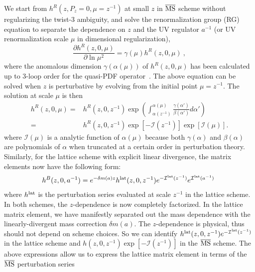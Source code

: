 \documentclass[prd,aps,nofootinbib,superscriptaddress,floatfix,preprintnumbers,twocolumn]{revtex4}
\newcommand{\FIXME}[1]{\textcolor{red}{ [FIXME: #1] }}
\begin{document}
We start from $h^R(z,P_z=0,\mu=z^{-1})$ at small $z$ in $\overline{\rm MS}$ scheme without regularizing the twist-3 ambiguity, and solve the renormalization group (RG) equation to separate the dependence on $z$ and the UV regulator $a^{-1}$ (or UV renormalization scale $\mu$ in dimensional regularization), 
\begin{equation}
    \frac{\partial h^R(z,0,\mu)}{\partial\ln\mu^2} = \gamma(\mu) h^R(z,0,\mu) \ , 
\end{equation}
where the anomalous dimension $\gamma(\alpha(\mu))$ of $h^R(z,0, \mu)$ has been calculated up to 3-loop order for the quasi-PDF operator~\cite{Braun:2020ymy}. 
The above equation can be solved when $z$ is 
perturbative by evolving from the initial point $\mu=z^{-1}$. The solution at scale $\mu$ is then
\begin{align}
    h^R(z,0,\mu)
    =&h^R (z,0,z^{-1})\exp{\left(\int_{\alpha(z^{-1})}^{\alpha(\mu)}\frac{\gamma(\alpha')}{\beta(\alpha')}d\alpha'\right)}\nonumber\\
    =&h^R(z,0,z^{-1})\exp{\left[-\mathcal{I}(z^{-1})\right]}\exp{\left[\mathcal{I}(\mu)\right]}.
    \label{eq:me_resum}
\end{align}
where $\mathcal{I}(\mu)$ is a analytic function of $\alpha(\mu)$ because both $\gamma(\alpha)$ and $\beta(\alpha)$ are polynomials of $\alpha$ when truncated at a certain order in perturbation theory.
Similarly, for the lattice scheme with explicit linear divergence, the matrix elements now have the following form:%
\begin{align}
    \!\!h^B(z,0,a^{-1})=e^{-\delta m(a) z}h^{\rm lat}(z,0,z^{-1})e^{-\mathcal{I^{{\rm lat}}}(z^{-1})}e^{\mathcal{I^{{\rm lat}}}(a^{-1})}
\end{align}
where $h^{{\rm lat}}$ is the perturbation series evaluated at scale $z^{-1}$ in the lattice scheme. In both schemes, the $z$-dependence is now completely factorized. In the lattice matrix element, we have manifestly separated out the mass dependence with the linearly-divergent mass correction $\delta m(a)$. The $z$-dependence is physical, thus should not depend on scheme choices. So we can identify $h^{\rm lat}(z,0,z^{-1})e^{-\mathcal{I^{{\rm lat}}}(z^{-1})}$ in the lattice scheme and $h(z,0,z^{-1})\exp{\left[-\mathcal{I}(z^{-1})\right]}$ in the $\overline{\rm MS}$ scheme.
The above expressions allow us to express the lattice matrix element in terms of the $\overline{\rm MS}$ perturbation series 
\end{document}
